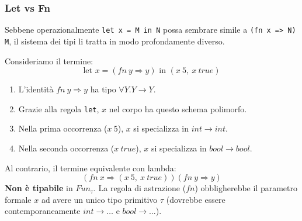 \documentclass[a4paper,11pt]{report}
\begin{document}
\subsubsection{Let vs Fn}
Sebbene operazionalmente \texttt{let x = M in N} possa sembrare simile a \texttt{(fn x => N) M}, il sistema dei tipi li tratta in modo profondamente diverso.

Consideriamo il termine:
\[ \text{let } x = (fn \ y \Rightarrow y) \text{ in } (x \ 5, \ x \ true) \]
\begin{enumerate}
    \item L'identità $fn \ y \Rightarrow y$ ha tipo $\forall Y. Y \to Y$.
    \item Grazie alla regola \texttt{let}, $x$ nel corpo ha questo schema polimorfo.
    \item Nella prima occorrenza ($x \ 5$), $x$ si specializza in $int \to int$.
    \item Nella seconda occorrenza ($x \ true$), $x$ si specializza in $bool \to bool$.
\end{enumerate}

Al contrario, il termine equivalente con lambda:
\[ (fn \ x \Rightarrow (x \ 5, \ x \ true)) (fn \ y \Rightarrow y) \]
\textbf{Non è tipabile} in $Fun_{\tau}$. La regola di astrazione ($fn$) obbligherebbe il parametro formale $x$ ad avere un unico tipo primitivo $\tau$ (dovrebbe essere contemporaneamente $int \to \dots$ e $bool \to \dots$).
\end{document}
